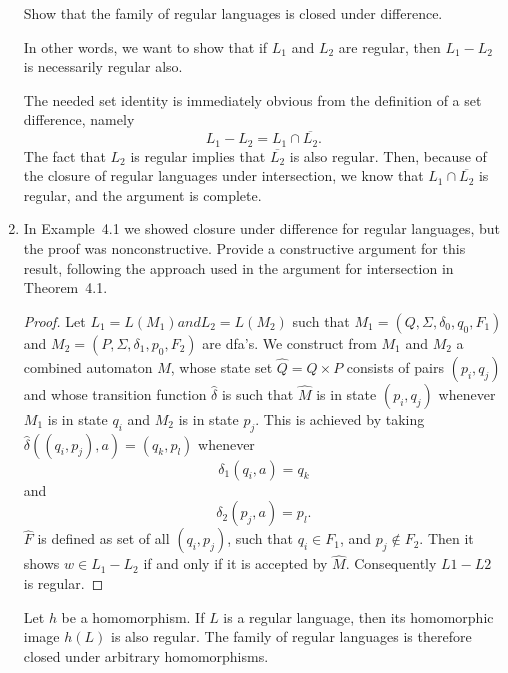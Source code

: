 \documentclass[]{book}
\theoremstyle{definition}
\newenvironment{thm}[1]
  {\renewcommand\theinnercustomtheorem{#1}\innercustomtheorem}
  {\endinnercustomtheorem}
\newenvironment{ex}[1]
  {\renewcommand\theinnercustomexample{#1}\innercustomexample}
  {\endinnercustomexample}
\begin{document}
\begin{enumerate}
    \begin{ex}{4.1}
        Show that the family of regular languages is closed under difference.

        In other words, we want to show that if $L_1$ and $L_2$ are regular,
        then $L_1 - L_2$ is necessarily regular also. \par
        The needed set identity is immediately obvious from the definition of a set
        difference, namely $$L_1 - L_2 = L_1 \cap \overline{L_2}.$$
        The fact that $L_2$ is regular implies that $\overline{L_2}$ is also regular.
        Then, because of the closure of regular languages under intersection,
        we know that $L_1 \cap \overline{L_2}$ is regular, and the argument is complete.
    \end{ex}
    
\item 
    In Example~4.1 we showed closure under difference for regular languages,
    but the proof was nonconstructive. Provide a constructive argument for this result,
    following the approach used in the argument for intersection in Theorem~4.1.
    
    \begin{proof}
        Let $L_1 = L(M_1) and L_2 = L(M_2)$ such that $M_1 = (Q, \Sigma, \delta_0, q_0, F_1)$ and
        $M_2 = (P, \Sigma, \delta_1, p_0, F_2)$ are dfa's. We construct from $M_1$ and $M_2$
        a combined automaton $\hat{M}$, whose state set $\hat{Q} = Q \times P$ consists of
        pairs $(p_i, q_j)$ and whose transition function $\hat{\delta}$ is such that $\hat{M}$ is
        in state $(p_i, q_j)$ whenever $M_1$ is in state $q_i$ and $M_2$ is in state $p_j$.
        This is achieved by taking $\hat{\delta}((q_i, p_j), a) = (q_k, p_l)$ whenever
            $$\delta_1(q_i, a) = q_k$$ and
            $$\delta_2(p_j, a) = p_l.$$
        $\hat{F}$ is defined as set of all $(q_i, p_j)$, such that $q_i \in F_1$, and
        $p_j \notin F_2$. Then it shows $w \in L_1 - L_2$ if and only if it is accepted by
        $\hat{M}$. Consequently $L1 - L2$ is regular.
    \end{proof}

\begin{thm}{4.3}
    Let $h$ be a homomorphism. If $L$ is a regular language, then its homomorphic image
    $h(L)$ is also regular. The family of regular languages is therefore closed under
    arbitrary homomorphisms.
    

\end{thm}
\end{enumerate}
\end{document}
